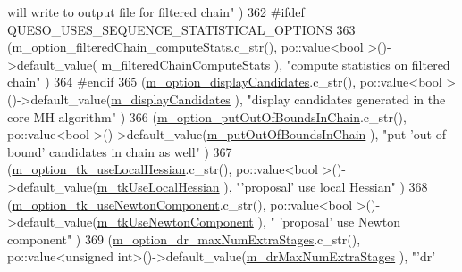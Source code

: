 \begin{DoxyCode}
{       will write to output file for filtered chain"}       )
362 #ifdef QUESO\_USES\_SEQUENCE\_STATISTICAL\_OPTIONS
363     (m\_option\_filteredChain\_computeStats.c\_str(),                 po::value<bool        >()->default\_value(
      m\_filteredChainComputeStats                ), \textcolor{stringliteral}{"compute statistics on filtered chain"}                        
          )
364 #endif
365     (\hyperlink{class_q_u_e_s_o_1_1_m_l_sampling_level_options_a54c504f38cb33871eb90b38b4ba80e89}{m\_option\_displayCandidates}.c\_str(),                          po::value<bool 
             >()->default\_value(\hyperlink{class_q_u_e_s_o_1_1_m_l_sampling_level_options_a975a24a45096ac07b8e3a6cade590bbc}{m\_displayCandidates}                        ), \textcolor{stringliteral}{"display
       candidates generated in the core MH algorithm"}           )
366     (\hyperlink{class_q_u_e_s_o_1_1_m_l_sampling_level_options_a1858cab9660831ae92eb12aad280aa67}{m\_option\_putOutOfBoundsInChain}.c\_str(),                      
      po::value<bool        >()->default\_value(\hyperlink{class_q_u_e_s_o_1_1_m_l_sampling_level_options_acf244c6ea5d1ac9c61d19d1d8f24fd8c}{m\_putOutOfBoundsInChain}                    ), \textcolor{stringliteral}{"put 'out
       of bound' candidates in chain as well"}                  )
367     (\hyperlink{class_q_u_e_s_o_1_1_m_l_sampling_level_options_a341b15acf7986499350294276d25954a}{m\_option\_tk\_useLocalHessian}.c\_str(),                         po::value<bool
              >()->default\_value(\hyperlink{class_q_u_e_s_o_1_1_m_l_sampling_level_options_a981084edf651ff9db5dd56a36ef54a61}{m\_tkUseLocalHessian}                        ), \textcolor{stringliteral}{"'proposal' use
       local Hessian"}                                    )
368     (\hyperlink{class_q_u_e_s_o_1_1_m_l_sampling_level_options_a875164924a6fe4ccf52d66db10c272a8}{m\_option\_tk\_useNewtonComponent}.c\_str(),                      
      po::value<bool        >()->default\_value(\hyperlink{class_q_u_e_s_o_1_1_m_l_sampling_level_options_aa763d458ffbb83ea5be881e9535a2cb5}{m\_tkUseNewtonComponent}                     ), \textcolor{stringliteral}{"
      'proposal' use Newton component"}                                 )
369     (\hyperlink{class_q_u_e_s_o_1_1_m_l_sampling_level_options_a20e22ade885c548888ba633bc71b5ab2}{m\_option\_dr\_maxNumExtraStages}.c\_str(),                       
      po::value<unsigned int>()->default\_value(\hyperlink{class_q_u_e_s_o_1_1_m_l_sampling_level_options_ab854494640bb98cad74ee656e62daab3}{m\_drMaxNumExtraStages}                      ), \textcolor{stringliteral}{"'dr'
}
\end{DoxyCode}
